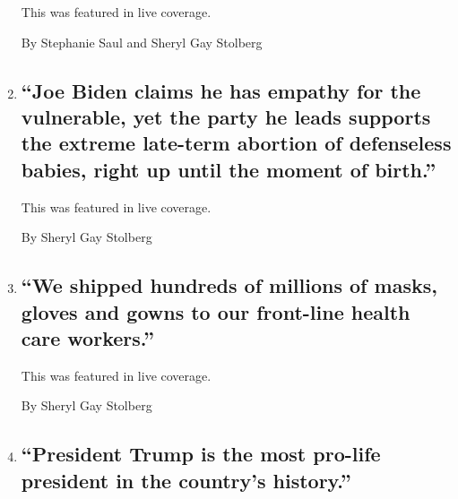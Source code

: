 \begin{enumerate}
  This was featured in live coverage.

  By Stephanie Saul and Sheryl Gay Stolberg
\item
  \href{/live/2020/08/27/us/rnc-fact-check/joe-biden-claims-he-has-empathy-for-the-vulnerable-yet-the-party-he-leads-supports-the-extreme-late-term-abortion-of-defenseless}{}

  \hypertarget{joe-biden-claims-he-has-empathy-for-the-vulnerable-yet-the-party-he-leads-supports-the-extreme-late-term-abortion-of-defenseless-babies-right-up-until-the-moment-of-birth}{%
  \subsection{``Joe Biden claims he has empathy for the vulnerable, yet
  the party he leads supports the extreme late-term abortion of
  defenseless babies, right up until the moment of
  birth.''}\label{joe-biden-claims-he-has-empathy-for-the-vulnerable-yet-the-party-he-leads-supports-the-extreme-late-term-abortion-of-defenseless-babies-right-up-until-the-moment-of-birth}}

  This was featured in live coverage.

  By Sheryl Gay Stolberg
\item
  \href{/live/2020/08/27/us/rnc-fact-check/we-shipped-hundreds-of-millions-of-masks-gloves-and-gowns-to-our-front-line-health-care-workers}{}

  \hypertarget{we-shipped-hundreds-of-millions-of-masks-gloves-and-gowns-to-our-front-line-health-care-workers}{%
  \subsection{``We shipped hundreds of millions of masks, gloves and
  gowns to our front-line health care
  workers.''}\label{we-shipped-hundreds-of-millions-of-masks-gloves-and-gowns-to-our-front-line-health-care-workers}}

  This was featured in live coverage.

  By Sheryl Gay Stolberg
\item
  \href{/live/2020/08/27/us/rnc-fact-check/president-trump-is-the-most-pro-life-president-in-the-countrys-history}{}

  \hypertarget{president-trump-is-the-most-pro-life-president-in-the-countrys-history}{%
  \subsection{``President Trump is the most pro-life president in the
  country's
  history.''}\label{president-trump-is-the-most-pro-life-president-in-the-countrys-history}}


\end{enumerate}
